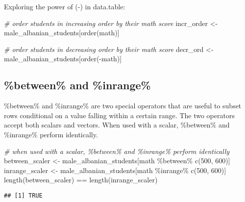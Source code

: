 \documentclass[
]{article}
\newenvironment{Shaded}{\begin{snugshade}}{\end{snugshade}}
\newcommand{\CommentTok}[1]{\textcolor[rgb]{0.56,0.35,0.01}{\textit{#1}}}
\newcommand{\DecValTok}[1]{\textcolor[rgb]{0.00,0.00,0.81}{#1}}
\newcommand{\FunctionTok}[1]{\textcolor[rgb]{0.00,0.00,0.00}{#1}}
\newcommand{\NormalTok}[1]{#1}
\newcommand{\OtherTok}[1]{\textcolor[rgb]{0.56,0.35,0.01}{#1}}
\newcommand{\SpecialCharTok}[1]{\textcolor[rgb]{0.00,0.00,0.00}{#1}}
\begin{document}
Exploring the power of (-) in data.table:

\begin{Shaded}
\begin{Highlighting}[]
\CommentTok{\# order students in increasing order by their math score}
\NormalTok{incr\_order }\OtherTok{\textless{}{-}}\NormalTok{ male\_albanian\_students[}\FunctionTok{order}\NormalTok{(math)]}
\end{Highlighting}
\end{Shaded}

\begin{Shaded}
\begin{Highlighting}[]
\CommentTok{\# order students in decreasing order by their math score}
\NormalTok{decr\_ord }\OtherTok{\textless{}{-}}\NormalTok{ male\_albanian\_students[}\FunctionTok{order}\NormalTok{(}\SpecialCharTok{{-}}\NormalTok{math)]}
\end{Highlighting}
\end{Shaded}

\hypertarget{between-and-inrange}{%
\subsection{\%between\% and \%inrange\%}\label{between-and-inrange}}

\%between\% and \%inrange\% are two special operators that are useful to
subset rows conditional on a value falling within a certain range. The
two operators accept both scalars and vectors. When used with a scalar,
\%between\% and \%inrange\% perform identically.

\begin{Shaded}
\begin{Highlighting}[]
\CommentTok{\# when used with a scalar, \%between\% and \%inrange\% perform identically}
\NormalTok{between\_scaler }\OtherTok{\textless{}{-}}\NormalTok{ male\_albanian\_students[math }\SpecialCharTok{\%between\%} \FunctionTok{c}\NormalTok{(}\DecValTok{500}\NormalTok{, }\DecValTok{600}\NormalTok{)]}
\NormalTok{inrange\_scaler }\OtherTok{\textless{}{-}}\NormalTok{ male\_albanian\_students[math }\SpecialCharTok{\%inrange\%} \FunctionTok{c}\NormalTok{(}\DecValTok{500}\NormalTok{, }\DecValTok{600}\NormalTok{)]}
\FunctionTok{length}\NormalTok{(between\_scaler) }\SpecialCharTok{==} \FunctionTok{length}\NormalTok{(inrange\_scaler)}
\end{Highlighting}
\end{Shaded}

\begin{verbatim}
## [1] TRUE
\end{verbatim}
\end{document}

